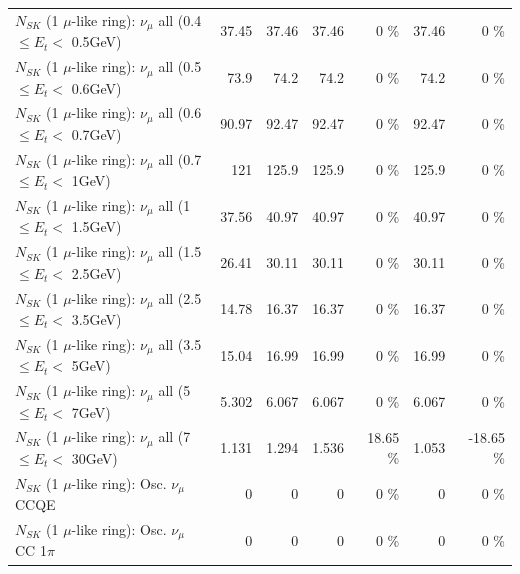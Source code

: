 \begin{table}
\begin{tabular}{| l | r | r | r  r | r  r |}
       $N_{SK}$ (1 $\mu$-like ring): $\nu_{\mu}$ all (0.4 $\leq E_{t} <$ 0.5GeV) &           37.45 &           37.46 &           37.46 &        0 \%  &           37.46 &        0 \%  \\ 
       $N_{SK}$ (1 $\mu$-like ring): $\nu_{\mu}$ all (0.5 $\leq E_{t} <$ 0.6GeV) &            73.9 &            74.2 &            74.2 &        0 \%  &            74.2 &        0 \%  \\ 
       $N_{SK}$ (1 $\mu$-like ring): $\nu_{\mu}$ all (0.6 $\leq E_{t} <$ 0.7GeV) &           90.97 &           92.47 &           92.47 &        0 \%  &           92.47 &        0 \%  \\ 
         $N_{SK}$ (1 $\mu$-like ring): $\nu_{\mu}$ all (0.7 $\leq E_{t} <$ 1GeV) &             121 &           125.9 &           125.9 &        0 \%  &           125.9 &        0 \%  \\ 
         $N_{SK}$ (1 $\mu$-like ring): $\nu_{\mu}$ all (1 $\leq E_{t} <$ 1.5GeV) &           37.56 &           40.97 &           40.97 &        0 \%  &           40.97 &        0 \%  \\ 
       $N_{SK}$ (1 $\mu$-like ring): $\nu_{\mu}$ all (1.5 $\leq E_{t} <$ 2.5GeV) &           26.41 &           30.11 &           30.11 &        0 \%  &           30.11 &        0 \%  \\ 
       $N_{SK}$ (1 $\mu$-like ring): $\nu_{\mu}$ all (2.5 $\leq E_{t} <$ 3.5GeV) &           14.78 &           16.37 &           16.37 &        0 \%  &           16.37 &        0 \%  \\ 
         $N_{SK}$ (1 $\mu$-like ring): $\nu_{\mu}$ all (3.5 $\leq E_{t} <$ 5GeV) &           15.04 &           16.99 &           16.99 &        0 \%  &           16.99 &        0 \%  \\ 
           $N_{SK}$ (1 $\mu$-like ring): $\nu_{\mu}$ all (5 $\leq E_{t} <$ 7GeV) &           5.302 &           6.067 &           6.067 &        0 \%  &           6.067 &        0 \%  \\ 
          $N_{SK}$ (1 $\mu$-like ring): $\nu_{\mu}$ all (7 $\leq E_{t} <$ 30GeV) &           1.131 &           1.294 &           1.536 &    18.65 \%  &           1.053 &   -18.65 \%  \\ 
\hline
\hline
                               $N_{SK}$ (1 $\mu$-like ring): Osc. $\nu_\mu$ CCQE &               0 &               0 &               0 &        0 \%  &               0 &        0 \%  \\ 
                          $N_{SK}$ (1 $\mu$-like ring): Osc. $\nu_\mu$ CC 1$\pi$ &               0 &               0 &               0 &        0 \%  &               0 &        0 \%  \\ 

\end{tabular}
\end{table}
